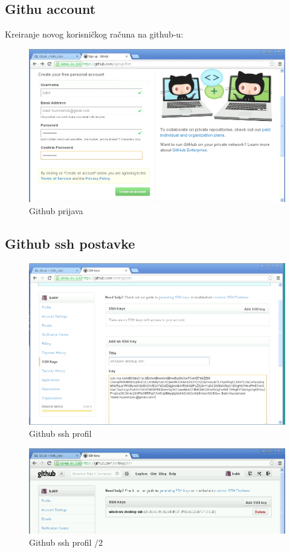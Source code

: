 \documentclass[times, utf8, seminar]{fit}
\begin{document}
\subsection{Githu account}

Kreiranje novog korisničkog računa na github-u:

\begin{figure}[H]
\centering
\includegraphics[width=15cm]{img/github_prijava.png}
\caption{Github prijava}
\end{figure}

\subsection{Github ssh postavke}

\begin{figure}[H]
\centering
\includegraphics[width=15cm]{img/github_ssh_profile.png}
\caption{Github ssh profil}
\end{figure}

\begin{figure}[H]
\centering
\includegraphics[width=15cm]{img/github_ssh_profile_2.png}
\caption{Github ssh profil /2}
\end{figure}
\end{document}
